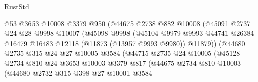 \begin{lexlean}{RustStd}
\begin{coremodule}
                                @53
                                @3653
                                @10008
                                @3379
                                @950
                                (@44675
                                  @2738
                                  @882
                                  @10008
                                  (@45091
                                    @2737
                                    @24
                                    @28
                                    @9998
                                    @10007
                                    (@45098
                                      @9998
                                      (@45104
                                        @9979
                                        @9993
                                        @44741
                                        @26384
                                        @16479
                                        @16483
                                        @12118
                                        (@11873 (@13957 @9993 @9980))
                                        @11879))
                                    (@44680
                                      @2735
                                      @315
                                      @24
                                      @27
                                      @10005
                                      @3584
                                      (@44715
                                        @2735
                                        @24
                                        @10005
                                        (@45128
                                          @2734
                                          @810
                                          @24
                                          @3653
                                          @10003
                                          @3379
                                          @817
                                          (@44675
                                            @2734
                                            @810
                                            @10003
                                            (@44680
                                              @2732
                                              @315
                                              @398
                                              @27
                                              @10001
                                              @3584

\end{coremodule}
\end{lexlean}
